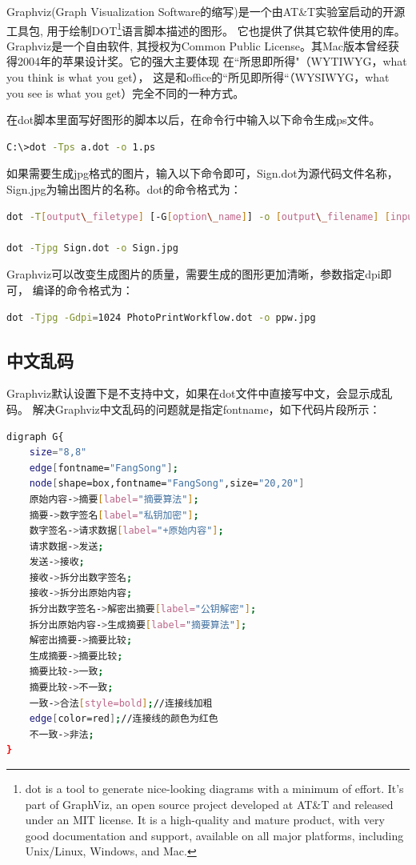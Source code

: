 \documentclass{book}
\begin{document}
Graphviz(Graph Visualization Software的缩写)是一个由AT\&T实验室启动的开源工具包,
用于绘制DOT\footnote{dot is a tool to generate nice-looking diagrams 
with a minimum of effort. It's part of GraphViz, 
an open source project developed at AT\&T and 
released under an MIT license. It is a high-quality 
and mature product, with very good documentation and 
support, available on all major platforms, 
including Unix/Linux, Windows, and Mac.}语言脚本描述的图形。
它也提供了供其它软件使用的库。Graphviz是一个自由软件,
其授权为Common Public License。其Mac版本曾经获得2004年的苹果设计奖。它的强大主要体现
在“所思即所得"（WYTIWYG，what you think is what you get），
这是和office的“所见即所得“（WYSIWYG，what you see is what you get）完全不同的一种方式。

在dot脚本里面写好图形的脚本以后，在命令行中输入以下命令生成ps文件。

\begin{lstlisting}[language=Bash]
C:\>dot -Tps a.dot -o 1.ps
\end{lstlisting}

如果需要生成jpg格式的图片，输入以下命令即可，Sign.dot为源代码文件名称，Sign.jpg为输出图片的名称。dot的命令格式为：

\begin{lstlisting}[language=Bash]
dot -T[output\_filetype] [-G[option\_name]] -o [output\_filename] [input\_filename] 

dot -Tjpg Sign.dot -o Sign.jpg
\end{lstlisting}

Graphviz可以改变生成图片的质量，需要生成的图形更加清晰，参数指定dpi即可，
编译的命令格式为：

\begin{lstlisting}[language=Bash]
dot -Tjpg -Gdpi=1024 PhotoPrintWorkflow.dot -o ppw.jpg
\end{lstlisting}

\subsection{中文乱码}

Graphviz默认设置下是不支持中文，如果在dot文件中直接写中文，会显示成乱码。
解决Graphviz中文乱码的问题就是指定fontname，如下代码片段所示：

\begin{lstlisting}[language=Bash]
digraph G{
	size="8,8"
	edge[fontname="FangSong"];
	node[shape=box,fontname="FangSong",size="20,20"]	
	原始内容->摘要[label="摘要算法"];
	摘要->数字签名[label="私钥加密"];
	数字签名->请求数据[label="+原始内容"];
	请求数据->发送;	
	发送->接收;
	接收->拆分出数字签名;
	接收->拆分出原始内容;
	拆分出数字签名->解密出摘要[label="公钥解密"];
	拆分出原始内容->生成摘要[label="摘要算法"];
	解密出摘要->摘要比较;
	生成摘要->摘要比较;
	摘要比较->一致;
	摘要比较->不一致;
	一致->合法[style=bold];//连接线加粗
	edge[color=red];//连接线的颜色为红色
	不一致->非法;	
}
\end{lstlisting}
\end{document}

